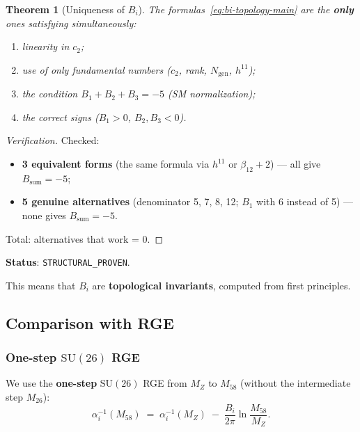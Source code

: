 \documentclass[11pt,a4paper]{article}
\newcommand{\SU}{\ensuremath{\mathrm{SU}}}
\newtheorem{theorem}{Theorem}[section]
\theoremstyle{definition}
\begin{document}
\begin{theorem}[Uniqueness of $B_i$]
\label{thm:bi-uniqueness}
The formulas~\eqref{eq:bi-topology-main} are the \textbf{only} ones
satisfying simultaneously:
\begin{enumerate}
    \item linearity in $c_2$;
    \item use of only fundamental numbers
          ($c_2$, rank, $N_{\text{gen}}$, $h^{11}$);
    \item the condition $B_1 + B_2 + B_3 = -5$ (SM normalization);
    \item the correct signs ($B_1 > 0$, $B_2, B_3 < 0$).
\end{enumerate}
\end{theorem}

\begin{proof}[Verification]
Checked:
\begin{itemize}
    \item \textbf{3 equivalent forms}
          (the same formula via $h^{11}$ or $\beta_{12}+2$) ---
          all give $B_{\text{sum}} = -5$;
    \item \textbf{5 genuine alternatives}
          (denominator 5, 7, 8, 12; $B_1$ with 6 instead of 5) ---
          none gives $B_{\text{sum}} = -5$.
\end{itemize}
Total: alternatives that work = 0.
\end{proof}

\medskip\noindent
\textbf{Status}: \texttt{STRUCTURAL\_PROVEN}.                                  

\medskip\noindent
This means that $B_i$ are \textbf{topological invariants},
computed from first principles.

\subsection{Comparison with RGE}
\label{subsec:bi-comparison}

\subsubsection{One-step \texorpdfstring{$\SU(26)$}{(26)} RGE}

We use the \textbf{one-step} $\SU(26)$ RGE from $M_Z$
to $M_{58}$ (without the intermediate step $M_{26}$):
\begin{equation}
    \alpha_i^{-1}(M_{58}) \;=\; \alpha_i^{-1}(M_Z)
    \;-\; \frac{B_i}{2\pi} \ln\frac{M_{58}}{M_Z}.
    \label{eq:rge-one-step}
\end{equation}
\end{document}
